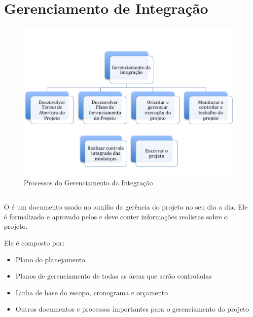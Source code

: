
\chapter{Gerenciamento de Integração}

\begin{figure}[!h]
\centering
\includegraphics[scale=0.75]{Figuras/gerenciamento_integracao.png}
\caption{Processos do Gerenciamento da Integração}
\label{fig:proc:ger:integr}
\end{figure}

\section{\planproj}

O \planproj é um documento usado no auxílio da gerência do projeto no seu dia a dia. Ele é formalizado e aprovado pelos \stake e deve conter informações realistas sobre o projeto.

Ele é composto por:

\begin{itemize}

\item Plano do planejamento

\item Planos de gerenciamento de todas as áreas que serão controladas

\item Linha de base do escopo, cronograma e orçamento

\item Outros documentos e processos importantes para o gerenciamento do projeto

\end{itemize}

